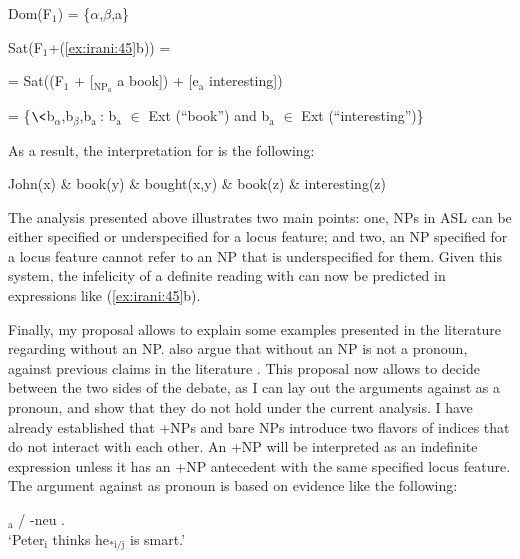 \documentclass[output=paper,
modfonts
]{langscibook}
\begin{document}
\begin{exe}

\ex Dom(F$_1$) = \{\(\alpha\),\(\beta\),a\}\par 

Sat(F$_1$+(\ref{ex:irani:45}b)) = \par 
= Sat((F$_1$ + [$_{\text{NP}_{a}}$ a book]) + [e$_\text{a}$ interesting]) \par 
= \{$\<$b$_{\alpha}$,b$_{\beta}$,b$_\text{a}\>$: b$_\text{a}$ \(\in\) Ext (``book'') and b$_\text{a}$ \(\in\) Ext (``interesting'')\} \par 

\end{exe}

As a result, the interpretation for  is the following:

\begin{exe}

\ex John(x) \& book(y) \& bought(x,y) \& book(z) \& interesting(z) 

\end{exe}

The analysis presented above illustrates two main points: one, NPs in ASL can be either specified or underspecified for a locus feature; and two, an NP specified for a locus feature cannot refer to an NP that is underspecified for them. Given this system, the infelicity of a definite reading with  can now be predicted in expressions like (\ref{ex:irani:45}b). 

Finally, my proposal allows to explain some examples presented in the literature regarding  without an NP. \citet{KoulidobrovaLilloMartin2016} also argue that  without an NP is not a pronoun, against previous claims in the literature \citep{Kuhn2015}. This proposal now allows to decide between the two sides of the debate, as I can lay out the arguments against  as a pronoun, and show that they do not hold under the current analysis. I have already established that +NPs and bare NPs introduce two flavors of indices that do not interact with each other. An +NP will be interpreted as an indefinite expression unless it has an +NP antecedent with the same specified locus feature. The argument against  as pronoun is based on evidence like the following: 

\begin{exe} 
	\ex \label{ex:irani:66}  $_\text{a}$ / -neu . \\
	`Peter$_\text{i}$ thinks he$_\text{*i/j}$ is smart.' \citep[241]{KoulidobrovaLilloMartin2016}
\end{exe} 
\end{document}
